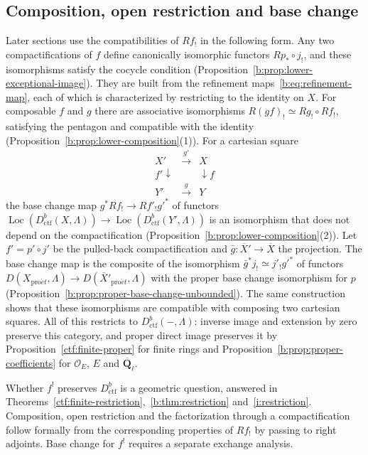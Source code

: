 \documentclass[11pt,a4paper]{article}
\numberwithin{equation}{section}
\theoremstyle{definition}
\theoremstyle{remark}
\newcommand{\Loc}{\operatorname{Loc}}
\newcommand{\Qbar}{\overline{\mathbf Q}_\ell}
\newcommand{\proet}{\mathrm{pro}\acute{e}t}
\newcommand{\Dctf}{D^b_{\mathrm{ctf}}}
\begin{document}
\subsection{Composition, open restriction and base change}
\label{n:compactifications}
Later sections use the compatibilities of $Rf_!$ in the following form. Any two compactifications of $f$ define
canonically isomorphic functors $Rp_*\circ j_!$, and these isomorphisms
satisfy the cocycle condition
(Proposition~\ref{b:prop:lower-exceptional-image}). They are built from
the refinement maps~\eqref{b:eq:refinement-map}, each of which is
characterized by restricting to the identity on $X$. For composable $f$
and $g$ there are associative isomorphisms
$R(gf)_!\simeq Rg_!\circ Rf_!$, satisfying the pentagon and compatible
with the identity (Proposition~\ref{b:prop:lower-composition}(1)). For a
cartesian square
\[
 \begin{array}{ccc}
 X'&\xrightarrow{g'}&X\\
 {\scriptstyle f'}\downarrow&&\downarrow{\scriptstyle f}\\
 Y'&\xrightarrow{g}&Y
 \end{array}
\]
the base change map $g^*Rf_!\to Rf'_!g'^*$ of functors
$\Loc(\Dctf(X,\Lambda))\to\Loc(\Dctf(Y',\Lambda))$ is an isomorphism that does not depend on the compactification
(Proposition~\ref{b:prop:lower-composition}(2)). Let $f'=p'\circ j'$ be
the pulled-back compactification and $\bar g\colon\overline X'\to\overline X$
the projection. The base change map is the composite of the isomorphism
$\bar g^*j_!\simeq j'_!g'^*$ of functors
$D(X_{\proet},\Lambda)\to D(\overline X'_{\proet},\Lambda)$ with the
proper base change isomorphism for $p$
(Proposition~\ref{b:prop:proper-base-change-unbounded}). The same
construction shows that these isomorphisms are compatible with
composing two cartesian squares. All of this restricts to
$\Dctf(-,\Lambda)$: inverse image and extension by zero
preserve this category, and proper direct image preserves it by
Proposition~\ref{ctf:finite-proper} for finite rings and
Proposition~\ref{b:prop:proper-coefficients} for $\mathcal O_E$, $E$ and $\Qbar$.



Whether $f^!$ preserves $\Dctf$ is a geometric question, answered in
Theorems~\ref{ctf:finite-restriction},~\ref{b:thm:restriction}
and~\ref{i:restriction}. Composition, open restriction and the
factorization through a compactification follow formally from the
corresponding properties of $Rf_!$ by passing to right adjoints. Base
change for $f^!$ requires a separate exchange analysis.
\end{document}
